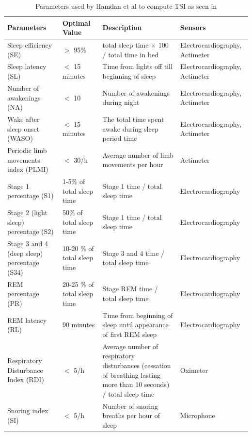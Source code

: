 \documentclass[12pt]{article} %
\begin{document}
\begin{table}[H]
\center
\begin{footnotesize}
	\begin{tabular}{|p{4cm} |p{2.6cm} |p{4cm} |p{3.3cm} |}
	\hline
	\textbf{Parameters} & \textbf{Optimal Value} & \textbf{Description} & \textbf{Sensors} \\
	\hline
	Sleep efficiency (SE) & $>$ 95\% & total sleep time $\times$ 100 / total time in bed & Electrocardiography, \newline Actimeter\\
	\hline
	Sleep latency (SL) & $<$ 15 minutes & Time from lights off till beginning of sleep & Electrocardiography, \newline Actimeter\\
	\hline 
	Number of awakenings (NA) & $<$ 10 & Number of awakenings during night & Electrocardiography, \newline Actimeter\\
	\hline
	Wake after sleep onset (WASO) & $<$ 15 minutes & The total time spent awake during sleep period time & Electrocardiography, \newline Actimeter\\
	\hline
	Periodic limb movements index (PLMI) & $<$ 30/h & Average number of limb movements per hour & Actimeter\\
	\hline
	Stage 1 percentage (S1) & 1-5\% of total sleep time & Stage 1 time / total sleep time & Electrocardiography\\
	\hline
	Stage 2 (light sleep) percentage (S2) & 50\% of total sleep time & Stage 1 time / total sleep time & Electrocardiography\\
	\hline
	Stage 3 and 4 (deep sleep) percentage (S34) & 10-20 \% of total sleep time & Stage 3 and 4 time / total sleep time & Electrocardiography\\
	\hline
	REM percentage (PR) & 20-25 \% of total sleep time & Stage REM time / total sleep time & Electrocardiography\\
	\hline
	REM latency (RL) & 90 minutes & Time from beginning of sleep until appearance of first REM sleep & Electrocardiography\\
	\hline
	Respiratory Disturbance Index (RDI) & $<$ 5/h & Average number of respiratory disturbances (cessation of breathing lasting more than 10 seconds) / total sleep time & Oximeter\\
	\hline
	Snoring index (SI) & $<$ 5/h & Number of snoring breaths per hour of sleep & Microphone\\
	\hline
	\end{tabular}
	\caption{Parameters used by Hamdan et al to compute TSI as seen in \cite{Hamdan2012ABS}}
	\label{tab:sleepQuality}
\end{footnotesize}
\end{table}
\end{document}

